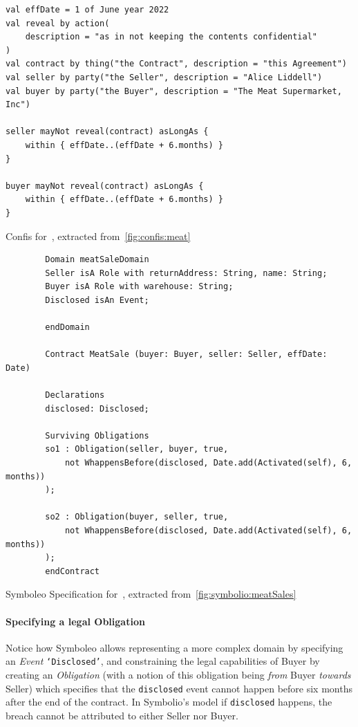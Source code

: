 \begin{listing}[h]
    \centering
    \begin{verbatim}
val effDate = 1 of June year 2022
val reveal by action(
    description = "as in not keeping the contents confidential"
)
val contract by thing("the Contract", description = "this Agreement")
val seller by party("the Seller", description = "Alice Liddell")
val buyer by party("the Buyer", description = "The Meat Supermarket, Inc")

seller mayNot reveal(contract) asLongAs {
    within { effDate..(effDate + 6.months) }
}

buyer mayNot reveal(contract) asLongAs {
    within { effDate..(effDate + 6.months) }
}
    \end{verbatim}
    \caption{Confis for~, extracted from~\autoref{fig:confis:meat}}
    \label{fig:confis:meat-confidentiality}
\end{listing}

\begin{listing}[h]
    \begin{verbatim}
        Domain meatSaleDomain
        Seller isA Role with returnAddress: String, name: String;
        Buyer isA Role with warehouse: String;
        Disclosed isAn Event;

        endDomain

        Contract MeatSale (buyer: Buyer, seller: Seller, effDate: Date)

        Declarations
        disclosed: Disclosed;

        Surviving Obligations
        so1 : Obligation(seller, buyer, true,
            not WhappensBefore(disclosed, Date.add(Activated(self), 6, months))
        );

        so2 : Obligation(buyer, seller, true,
            not WhappensBefore(disclosed, Date.add(Activated(self), 6, months))
        );
        endContract
    \end{verbatim}
    \caption{Symboleo Specification for~, extracted from~\autoref{fig:symbolio:meatSales}}
    \label{fig:symbolio:meatSales-confidentiality}
\end{listing}

\paragraph{Specifying a legal Obligation}
Notice how Symboleo allows representing a more complex domain by specifying an \emph{Event} \texttt{`Disclosed'}, and constraining the legal capabilities of Buyer by creating an \emph{Obligation} (with a notion of this obligation being \emph{from} Buyer \emph{towards} Seller) which specifies that the \texttt{disclosed} event cannot happen before six months after the end of the contract.
In Symbolio's model if \texttt{disclosed} happens, the breach cannot be attributed to either Seller nor Buyer.

